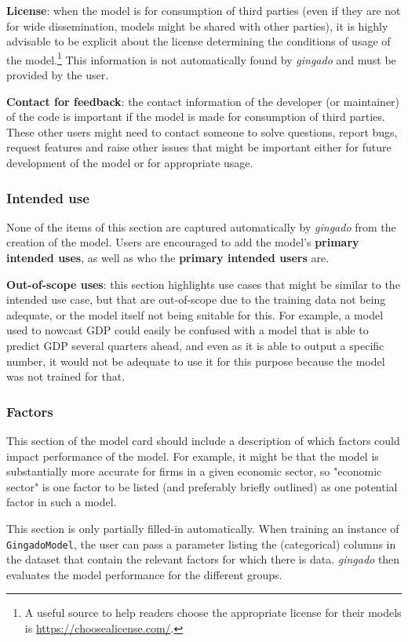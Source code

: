 \documentclass{article}
\begin{document}
\textbf{License}: when the model is for consumption of third parties (even if they are not for wide dissemination, models might be shared with other parties), it is highly advisable to be explicit about the license determining the conditions of usage of the model.\footnote{A useful source to help readers choose the appropriate license for their models is \url{https://choosealicense.com/}.} This information is not automatically found by \textit{gingado} and must be provided by the user.

\textbf{Contact for feedback}: the contact information of the developer (or maintainer) of the code is important if the model is made for consumption of third parties. These other users might need to contact someone to solve questions, report bugs, request features and raise other issues that might be important either for future development of the model or for appropriate usage.

\subsubsection{Intended use}

None of the items of this section are captured automatically by \textit{gingado} from the creation of the model. Users are encouraged to add the model's \textbf{primary intended uses}, as well as who the \textbf{primary intended users} are.

\textbf{Out-of-scope uses}: this section highlights use cases that might be similar to the intended use case, but that are out-of-scope due to the training data not being adequate, or the model itself not being suitable for this. For example, a model used to nowcast GDP could easily be confused with a model that is able to predict GDP several quarters ahead, and even as it is able to output a specific number, it would not be adequate to use it for this purpose because the model was not trained for that.

\subsubsection{Factors}
This section of the model card should include a description of which factors could impact performance of the model. For example, it might be that the model is substantially more accurate for firms in a given economic sector, so "economic sector" is one factor to be listed (and preferably briefly outlined) as one potential factor in such a model.

This section is only partially filled-in automatically. When training an instance of \texttt{GingadoModel}, the user can pass a parameter listing the (categorical) columns in the dataset that contain the relevant factors for which there is data. \textit{gingado} then evaluates the model performance for the different groups.
\end{document}
